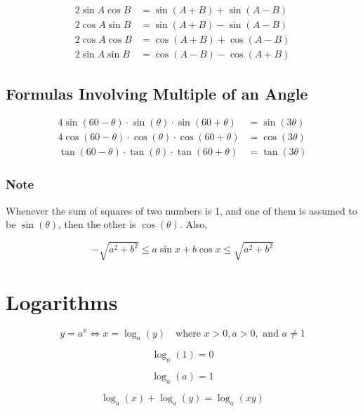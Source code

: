 \documentclass{article}
\begin{document}
\begin{align}
2\sin A\cos B &= \sin(A+B) + \sin(A-B) \\
2\cos A\sin B &= \sin(A+B) - \sin(A-B) \\
2\cos A\cos B &= \cos(A+B) + \cos(A-B) \\
2\sin A\sin B &= \cos(A-B) - \cos(A+B)
\end{align}

\subsection{Formulas Involving Multiple of an Angle}

\begin{align}
4\sin(60-\theta) \cdot \sin(\theta) \cdot \sin(60+\theta) &= \sin(3\theta) \\
4\cos(60-\theta) \cdot \cos(\theta) \cdot \cos(60+\theta) &= \cos(3\theta) \\
\tan(60-\theta) \cdot \tan(\theta) \cdot \tan(60+\theta) &= \tan(3\theta)
\end{align}

\subsubsection{Note}

Whenever the sum of squares of two numbers is 1, and one of them is assumed to be \(\sin(\theta)\), then the other is \(\cos(\theta)\). Also,

\[
-\sqrt{a^2+b^2} \leq a\sin x + b\cos x \leq \sqrt{a^2+b^2}
\]

\section{Logarithms}

\begin{equation}
y = a^x \iff x = \log_a(y) \quad \text{where } x > 0, a > 0, \text{ and } a \neq 1
\end{equation}

\begin{equation}
\log_a(1) = 0
\end{equation}

\begin{equation}
\log_a(a) = 1
\end{equation}

\begin{equation}
\log_a(x) + \log_a(y) = \log_a(xy)
\end{equation}
\end{document}
